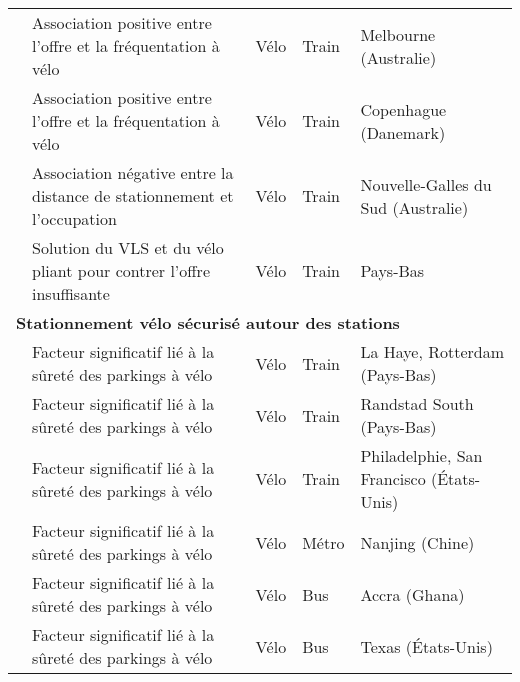 \begin{longtable}{p{3cm}p{4cm}p{1.5cm}p{1.8cm}p{2.3cm}}
    \small{\textcite{weliwitiya_bicycle_2019}}\index{Weliwitiya, Hesara|pagebf} & \small{Association positive entre l'offre et la fréquentation à vélo} & \small{Vélo} & \small{Train} & \small{Melbourne (Australie)}\\
    \small{\textcite{halldorsdottir_home-end_2017}}\index{Halldórsdóttir, Katrín|pagebf} & \small{Association positive entre l'offre et la fréquentation à vélo} & \small{Vélo} & \small{Train} & \small{Copenhague (Danemark)}\\
    \small{\textcite{arbis_analysis_2016}}\index{Arbis, David|pagebf} & \small{Association négative entre la distance de stationnement et l'occupation} & \small{Vélo} & \small{Train} & \small{Nouvelle-Galles du Sud (Australie)}\\
    \small{\textcite{jonkeren_bicycle_2021}}\index{Jonkeren, Olaf|pagebf} & \small{Solution du VLS et du vélo pliant pour contrer l'offre insuffisante} & \small{Vélo} & \small{Train} & \small{Pays-Bas}\\
        \hline
\multicolumn{5}{l}{\textbf{Stationnement vélo sécurisé autour des stations}}\\
    \small{\textcite{la_paix_puello_role_2021}}\index{La Paix Puello, Lissy|pagebf} & \small{Facteur significatif lié à la sûreté des parkings à vélo} & \small{Vélo} & \small{Train} & \small{La Haye, Rotterdam (Pays-Bas)}\\
    \small{\textcite{la_paix_puello_modelling_2015}}\index{La Paix Puello, Lissy|pagebf} & \small{Facteur significatif lié à la sûreté des parkings à vélo} & \small{Vélo} & \small{Train} & \small{Randstad South (Pays-Bas)}\\
    \small{\textcite{flamm_public_2014}}\index{Flamm, Bradley J.|pagebf} & \small{Facteur significatif lié à la sûreté des parkings à vélo} & \small{Vélo} & \small{Train} & \small{Philadelphie, San Francisco (États-Unis)}\\
    \small{\textcite{yang_metro_2015}}\index{Yang, Min|pagebf} & \small{Facteur significatif lié à la sûreté des parkings à vélo} & \small{Vélo} & \small{Métro} & \small{Nanjing (Chine)}\\
    \small{\textcite{quarshie_integrating_2007}}\index{Quarshie, Magnus|pagebf} & \small{Facteur significatif lié à la sûreté des parkings à vélo} & \small{Vélo} & \small{Bus} & \small{Accra (Ghana)}\\
    \small{\textcite{taylor_analysis_1996}}\index{Taylor, Dean|pagebf} & \small{Facteur significatif lié à la sûreté des parkings à vélo} & \small{Vélo} & \small{Bus} & \small{Texas (États-Unis)}\\

\end{longtable}
